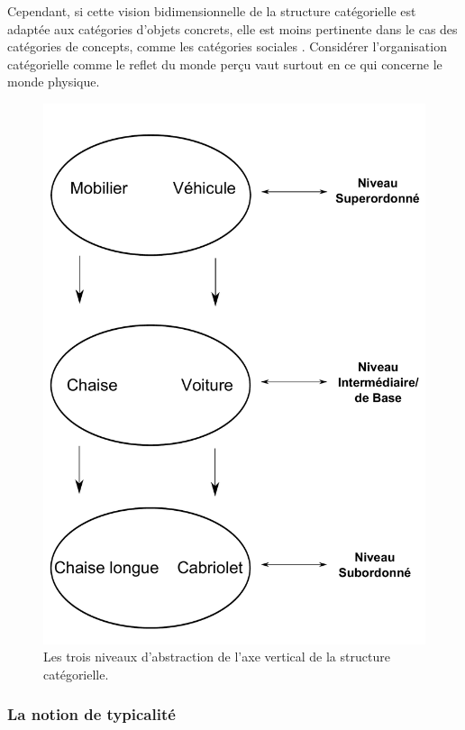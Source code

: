 
Cependant, si cette vision bidimensionnelle de la structure catégorielle est adaptée aux catégories d'objets concrets, elle est moins pertinente dans le cas des catégories de concepts, comme les catégories sociales \citep[p. 72-88]{dubois1991semantique}. Considérer l'organisation catégorielle comme le reflet du monde perçu vaut surtout en ce qui concerne le monde physique.

\begin{figure}[t]
        \myfloatalign
        \includegraphics[width=.6\linewidth]{gfx/categorieLVL}
        \caption{Les trois niveaux d'abstraction de l'axe vertical de la structure catégorielle.}\label{fig:categorieLVL}
\end{figure}

\subsubsection{La notion de typicalité}
\label{sec:ch3_typicité}

